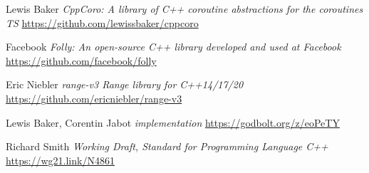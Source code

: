 \documentclass{wg21}
\begin{document}
\begin{thebibliography}{9}
    Lewis Baker
    \emph{CppCoro: A library of C++ coroutine abstractions for the coroutines TS}\newline
    \url{https://github.com/lewissbaker/cppcoro}
    
    Facebook
    \emph{Folly: An open-source C++ library developed and used at Facebook}\newline
    \url{https://github.com/facebook/folly}
    
    
    Eric Niebler
    \emph{range-v3 Range library for C++14/17/20}\newline
    \url{https://github.com/ericniebler/range-v3}
    
    Lewis Baker, Corentin Jabot
    \emph{ implementation}\newline
    \url{https://godbolt.org/z/eoPeTY}
    
    Richard Smith
    \emph{Working Draft, Standard for Programming Language C++}\newline
    \url{https://wg21.link/N4861}
    
    
\end{thebibliography}
    
\end{document}
